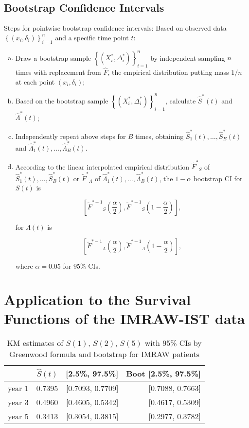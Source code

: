 \documentclass[11pt]{article}
\newcommand{\hS}{\hat{S}}
\newcommand{\hsS}{\hat{S}^{*}}
\newcommand{\hsLam}{\hat{\Lambda}^{*}}
\newcommand{\hF}{\hat{F}}
\newcommand{\tsF}{{\tilde{F}^{*}}}
\newcommand{\invtsF}{{\tilde{F}^{*-1}}}
\begin{document}
\subsection{Bootstrap Confidence Intervals}
Steps for pointwise bootstrap confidence intervals:
Based on observed data $\left\{ (x_i,\delta_i) \right\}_{i=1}^n$ and a specific
time point $t$:
\begin{enumerate}[(a)]
\item Draw a bootstrap sample $\left\{ (X_i^{*},\Delta_i^{*}) \right\}_{i=1}^n$
  by independent sampling $n$ times with replacement from $\hF$, the empirical
  distribution putting mass $1/n$ at each point $(x_i,\delta_i)$;
\item Based on the bootstrap sample $\left\{ (X_i^{*},\Delta_i^{*})
  \right\}_{i=1}^n$, calculate $\hsS (t)$ and $\hsLam (t)$;
\item Independently repeat above steps for $B$ times, obtaining
  $\hsS_1(t),\dots, \hsS_B(t)$ and $\hsLam_1(t),\dots,\hsLam_B(t)$.
\item According to the linear interpolated empirical distribution $\tsF_S$ of
  $\hsS_1(t),\dots, \hsS_B(t)$ or $\tsF_{\Lambda}$ of
  $\hsLam_1(t),\dots,\hsLam_B(t)$, the $1-\alpha$ bootstrap CI for $S(t)$ is

\begin{equation*}
  \left[\invtsF_S\left(\frac{\alpha}{2}\right), \invtsF_S\left(1-\frac{\alpha}{2}\right)\right],
\end{equation*}

  for $\Lambda (t)$ is 
  
\begin{equation*}
\left[\invtsF_{\Lambda}\left(\frac{\alpha}{2}\right), \invtsF_{\Lambda}\left(1-\frac{\alpha}{2}\right)\right],
\end{equation*}

where $\alpha = 0.05$ for $95\%$ CIs.

\end{enumerate}

\section{Application to the Survival Functions of the IMRAW-IST data}

\begin{table}[H]
\caption{KM estimates of $S(1)$, $S(2)$, $S(5)$
             with 95\% CIs by Greenwood formula and bootstrap for IMRAW patients} 
\centering
\begin{tabular}{rrrr}
  \hline
  \hline
 & $\hS(t)$ & [2.5\%, 97.5\%] & Boot [2.5\%, 97.5\%] \\ 
  \hline
  year 1 & 0.7395 & [0.7093, 0.7709] & [0.7088, 0.7663] \\ 
  year 3 & 0.4960 & [0.4605, 0.5342] & [0.4617, 0.5309] \\ 
  year 5 & 0.3413 & [0.3054, 0.3815] & [0.2977, 0.3782] \\ 
   \hline
\end{tabular}
\end{table}
\end{document}
